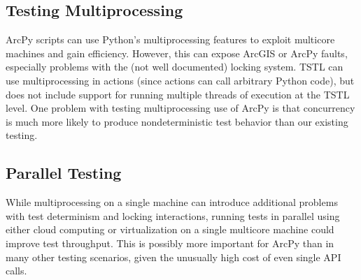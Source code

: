 \subsection{Testing Multiprocessing}

ArcPy scripts can use Python's multiprocessing features to exploit
multicore machines and gain efficiency.  However, this can expose
ArcGIS or ArcPy faults, especially problems with the (not well
documented) locking system.  TSTL can use multiprocessing in actions
(since actions can call arbitrary Python code), but does not include
support for running multiple threads of execution at the TSTL level.
One problem with testing multiprocessing use of ArcPy is that
concurrency is much more likely to produce nondeterministic test
behavior than our existing testing.


\subsection{Parallel Testing}

While multiprocessing on a single machine can introduce additional
problems with test determinism and locking interactions, running tests
in parallel using either cloud computing or virtualization on a
single multicore machine could improve test throughput.   This is
possibly more important for ArcPy than in many other testing
scenarios, given the unusually high cost of even single API calls.